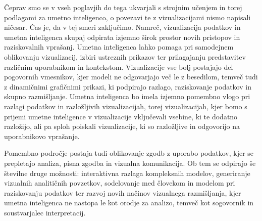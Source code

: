 Čeprav smo se v vseh poglavjih do tega ukvarjali s strojnim učenjem in torej podlagami za umetno inteligenco, o povezavi te z vizualizacijami nismo napisali ničesar. Čas je, da v tej smeri zaključimo. Namreč, vizualizacija podatkov in umetna inteligenca skupaj odpirata izjemno širok prostor novih pristopov in raziskovalnih vprašanj. Umetna inteligenca lahko pomaga pri samodejnem oblikovanju vizualizacij, izbiri ustreznih prikazov ter prilagajanju predstavitev različnim uporabnikom in kontekstom. Vizualizacije vse bolj postajajo del pogovornih vmesnikov, kjer modeli ne odgovarjajo več le z besedilom, temveč tudi z dinamičnimi grafičnimi prikazi, ki podpirajo razlago, raziskovanje podatkov in skupno razmišljanje. Umetna inteligenca bo imela izjemno pomembno vlogo pri razlagi podatkov in razložljivih vizualizacijah, torej vizualizacijah, kjer bomo s prijemi umetne inteligence v vizualizacije vključevali vsebine, ki te dodatno razložijo, ali pa sploh poiskali vizualizacije, ki so razložljive in odgovorijo na uporabnikovo vprašanje.

Pomembno področje postaja tudi oblikovanje zgodb z uporabo podatkov, kjer se prepletajo analiza, pisna zgodba in vizualna komunikacija. Ob tem se odpirajo še številne druge možnosti: interaktivna razlaga kompleksnih modelov, generiranje vizualnih analitičnih povzetkov, sodelovanje med človekom in modelom pri raziskovanju podatkov ter razvoj novih načinov vizualnega razmišljanja, kjer umetna inteligenca ne nastopa le kot orodje za analizo, temveč kot sogovornik in soustvarjalec interpretacij.